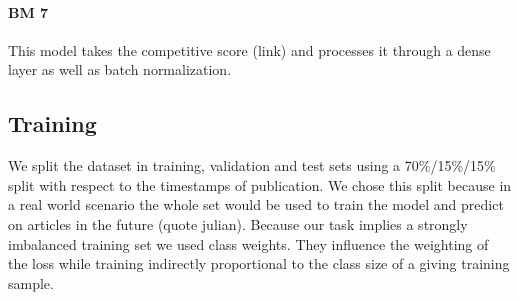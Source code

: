 \paragraph{BM 7} This model takes the competitive score (link) and processes it through a dense layer as well as batch normalization.

\subsection{Training}
We split the dataset in training, validation and test sets using a 70\%/15\%/15\% split with respect to the timestamps of publication. We chose this split because in a real world scenario the whole set would be used to train the model and predict on articles in the future (quote julian).
Because our task implies a strongly imbalanced training set we used class weights. They influence the weighting of the loss while training indirectly proportional to the class size of a giving training sample.
